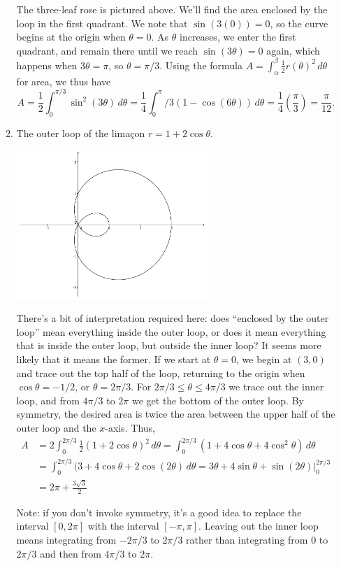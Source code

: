 \documentclass[12pt]{article}
\newcommand{\di}{\displaystyle}
\begin{document}
\begin{enumerate}
\begin{enumerate}
The three-leaf rose is pictured above. We'll find the area enclosed by the loop in the first quadrant. We note that $\sin(3(0))=0$, so the curve begins at the origin when $\theta=0$. As $\theta$ increases, we enter the first quadrant, and remain there until we reach $\sin(3\theta)=0$ again, which happens when $3\theta = \pi$, so $\theta = \pi/3$. Using the formula $\di A = \int_\alpha^\beta \frac{1}{2}r(\theta)^2\,d\theta$ for area, we thus have
\[
 A = \frac{1}{2}\int_0^{\pi/3}\sin^2(3\theta)\,d\theta = \frac{1}{4}\int_0^\pi/3 (1-\cos(6\theta))\,d\theta = \frac{1}{4}(\frac{\pi}{3}) = \frac{\pi}{12}.
\]
\newpage
\item The outer loop of the lima{\c c}on $r=1+2\cos\theta$.

\begin{center}
 \includegraphics[width=0.6\textwidth]{WS6-4b}
\end{center}

There's a bit of interpretation required here: does ``enclosed by the outer loop'' mean everything inside the outer loop, or does it mean everything that is inside the outer loop, but outside the inner loop? It seems more likely that it means the former. If we start at $\theta = 0$, we begin at $(3,0)$ and trace out the top half of the loop, returning to the origin when $\cos\theta = -1/2$, or $\theta = 2\pi/3$. For $2\pi/3\leq \theta\leq 4\pi/3$ we trace out the inner loop, and from $4\pi/3$ to $2\pi$ we get the bottom of the outer loop. By symmetry, the desired area is twice the area between the upper half of the outer loop and the $x$-axis. Thus,
\begin{align*}
 A &= 2\int_0^{2\pi/3}\frac{1}{2}(1+2\cos\theta)^2\,d\theta = \int_0^{2\pi/3}(1+4\cos\theta+4\cos^2\theta)\,d\theta\\
& = \int_0^{2\pi/3}(3+4\cos\theta+2\cos(2\theta)\,d\theta = \left. 3\theta+4\sin\theta+\sin(2\theta)\right|_0^{2\pi/3}\\
& = 2\pi+\frac{3\sqrt{3}}{2}
\end{align*}

Note: if you don't invoke symmetry, it's a good idea to replace the interval $[0,2\pi]$ with the interval $[-\pi,\pi]$. Leaving out the inner loop means integrating from $-2\pi/3$ to $2\pi/3$ rather than integrating from 0 to $2\pi/3$ and then from $4\pi/3$ to $2\pi$.

\end{enumerate}
\end{enumerate}
\end{document}

